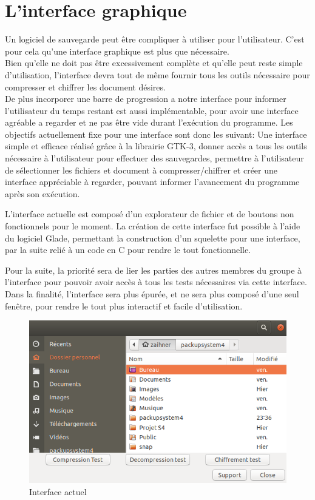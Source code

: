 \section{L'interface graphique}
    Un logiciel de sauvegarde peut être compliquer à utiliser pour l'utilisateur. C'est pour cela qu'une interface graphique est plus que nécessaire. \\
    Bien qu'elle ne doit pas être excessivement complète et qu'elle peut reste simple d'utilisation, l'interface devra tout de même fournir tous les outils nécessaire pour compresser et chiffrer les document désires. \\
    De plus incorporer une barre de progression a notre interface pour informer l'utilisateur du temps restant est aussi implémentable, pour avoir une interface agréable a regarder et ne pas être vide durant l'exécution du programme. Les objectifs actuellement fixe pour une interface sont donc les suivant: Une interface simple et efficace réalisé grâce à la librairie GTK-3, donner accès a tous les outils nécessaire à l'utilisateur pour effectuer des sauvegardes, permettre à l'utilisateur de sélectionner les fichiers et document à compresser/chiffrer et créer une interface appréciable à regarder, pouvant informer l'avancement du programme après son exécution. 
    
    L'interface actuelle est composé d'un explorateur de fichier et de boutons non fonctionnels pour le moment. La création de cette interface fut possible à l'aide du logiciel Glade, permettant la construction d'un squelette pour une interface, par la suite relié à un code en C pour rendre le tout fonctionnelle.

    Pour la suite, la priorité sera de lier les parties des autres membres du groupe à l'interface pour pouvoir avoir accès à tous les tests nécessaires via cette interface. Dans la finalité, l'interface sera plus épurée, et ne sera plus composé d'une seul fenêtre, pour rendre le tout plus interactif et facile d'utilisation.
    
	\begin{figure}[!h]
		\centering
		\includegraphics[width=12.1cm]{images/gui-screen.png}
		\caption{Interface actuel}
		\label{Interface actuel}
	\end{figure}
    
